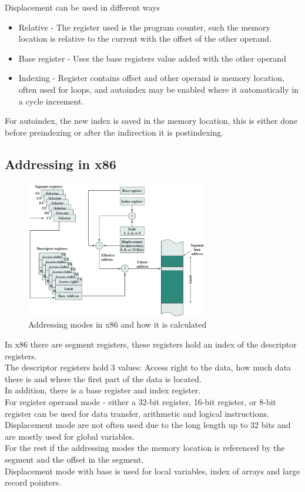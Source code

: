 \documentclass[12pt, a4paper]{article}
\begin{document}
			Displacement can be used in different ways
			\begin{itemize}
				\item Relative - The register used is the program counter, such the memory location is relative to the current with the offset of the other operand.
				\item Base register - Uses the base registers value added with the other operand
				\item Indexing - Register contains offset and other operand is memory location, often used for loops, and autoindex may be enabled where it automatically in a cycle increment.
			\end{itemize}
			 For autoindex, the new index is saved in the memory location, this is either done before preindexing or after the indirection it is postindexing.
		\subsection{Addressing in x86}
			\begin{figure}[h!]
				\centering
				\includegraphics[width=300px]{assets/addressingModesCalculation.png}
				\caption{Addressing modes in x86 and how it is calculated}
			\end{figure}
			In x86 there are segment registers, these registers hold an index of the descriptor registers.\\
			The descriptor registers hold 3 values: Access right to the data, how much data there is and where the first part of the data is located.\\
			In addition, there is a base register and index register.\\
			For register operand mode - either a 32-bit register, 16-bit register, or 8-bit register can be used for data transfer, arithmetic and logical instructions.\\
			Displacement mode are not often used due to the long length up to 32 bits and are mostly used for global variables.\\
			For the rest if the addressing modes the memory location is referenced by the segment and the offset in the segment.\\
			Displacement mode with base is used for local variables, index of arrays and large record pointers.\\
\end{document}
